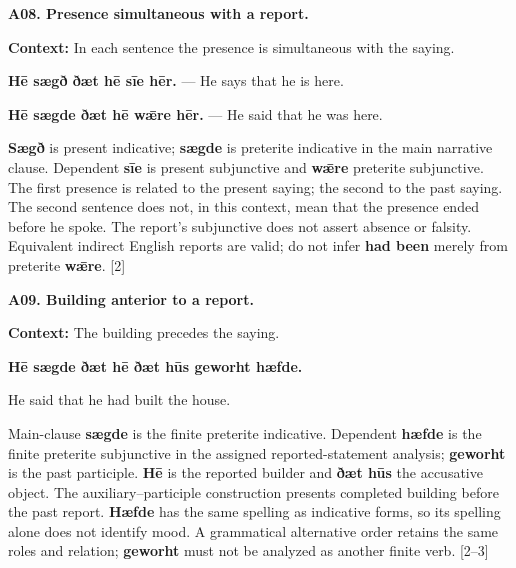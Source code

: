\par\begin{minipage}{\linewidth}\raggedright
\textbf{A08. Presence simultaneous with a report.}

\textbf{Context:} In each sentence the presence is simultaneous with the saying.

\textbf{Hē sægð ðæt hē sīe hēr.} — He says that he is here.

\textbf{Hē sægde ðæt hē wǣre hēr.} — He said that he was here.

\textbf{Sægð} is present indicative; \textbf{sægde} is preterite indicative in the main narrative clause. Dependent \textbf{sīe} is present subjunctive and \textbf{wǣre} preterite subjunctive. The first presence is related to the present saying; the second to the past saying. The second sentence does not, in this context, mean that the presence ended before he spoke. The report's subjunctive does not assert absence or falsity. Equivalent indirect English reports are valid; do not infer \textbf{had been} merely from preterite \textbf{wǣre}. [2]

\end{minipage}\par\addvspace{4pt}

\par\begin{minipage}{\linewidth}\raggedright
\textbf{A09. Building anterior to a report.}

\textbf{Context:} The building precedes the saying.

\textbf{Hē sægde ðæt hē ðæt hūs geworht hæfde.}

He said that he had built the house.

Main-clause \textbf{sægde} is the finite preterite indicative. Dependent \textbf{hæfde} is the finite preterite subjunctive in the assigned reported-statement analysis; \textbf{geworht} is the past participle. \textbf{Hē} is the reported builder and \textbf{ðæt hūs} the accusative object. The auxiliary–participle construction presents completed building before the past report. \textbf{Hæfde} has the same spelling as indicative forms, so its spelling alone does not identify mood. A grammatical alternative order retains the same roles and relation; \textbf{geworht} must not be analyzed as another finite verb. [2–3]

\end{minipage}\par\addvspace{4pt}

